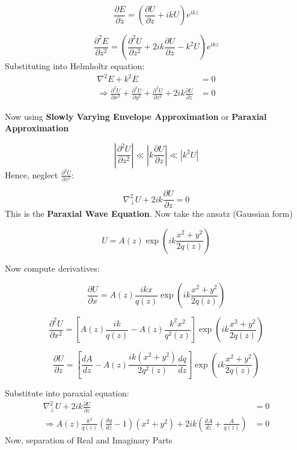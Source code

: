 $$
\frac{\partial E}{\partial z} = \left( \frac{\partial U}{\partial z} + ikU \right) e^{ikz}
$$

$$
\frac{\partial^2 E}{\partial z^2}
= \left( \frac{\partial^2 U}{\partial z^2} + 2ik \frac{\partial U}{\partial z} - k^2 U \right) e^{ikz}
$$
Substituting into Helmholtz equation:
\begin{align}
\nabla^2 E + k^2 E &= 0 \\
\Rightarrow \frac{\partial^2 U}{\partial x^2}
+ \frac{\partial^2 U}{\partial y^2}
+ \frac{\partial^2 U}{\partial z^2}
+ 2ik \frac{\partial U}{\partial z} &= 0
\end{align}

Now using \textbf{Slowly Varying Envelope Approximation} or \textbf{Paraxial Approximation}

\begin{equation}
\left| \frac{\partial^2 U}{\partial z^2} \right| \ll
\left| k \frac{\partial U}{\partial z} \right|
\ll |k^2 U|
\end{equation}
Hence, neglect $\frac{\partial^2 U}{\partial z^2}$:

\begin{equation}
\nabla_\perp^2 U + 2ik \frac{\partial U}{\partial z} = 0
\end{equation}
This is the \textbf{Paraxial Wave Equation}.
Now take the ansatz (Gaussian form)

\begin{equation}
U = A(z) \exp \left( i k \frac{x^2 + y^2}{2q(z)} \right)
\end{equation}

Now compute derivatives:

$$
\frac{\partial U}{\partial x}
= A(z) \frac{ikx}{q(z)} \exp \left( i k \frac{x^2 + y^2}{2q(z)} \right)
$$

$$
\frac{\partial^2 U}{\partial x^2}
= \left[ A(z) \frac{ik}{q(z)} - A(z) \frac{k^2 x^2}{q^2(z)} \right]
\exp \left( i k \frac{x^2 + y^2}{2q(z)} \right)
$$

$$
\frac{\partial U}{\partial z}
=
\left[
\frac{dA}{dz}
- A(z) \frac{ik(x^2+y^2)}{2q^2(z)} \frac{dq}{dz}
\right]
\exp \left( i k \frac{x^2 + y^2}{2q(z)} \right)
$$

Substitute into paraxial equation:
\begin{align}
\nabla_\perp^2 U + 2ik \frac{\partial U}{\partial z} &= 0 \\
\Rightarrow
A(z)\frac{k^2}{q(z)} \left( \frac{dq}{dz} - 1 \right)(x^2+y^2)
+ 2ik \left( \frac{dA}{dz} + \frac{A}{q(z)} \right) &= 0
\end{align}
Now, separation of Real and Imaginary Parts

